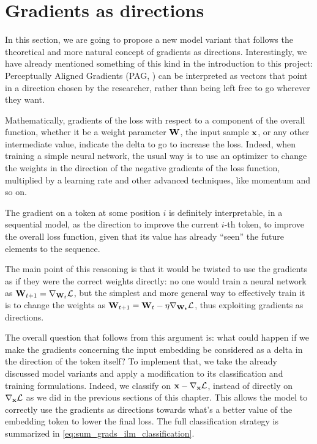 \documentclass[../thesis.tex]{subfiles}
\begin{document}


\section{Gradients as directions}
\label{sec:ilm_inversion_gradients_token_directions}
In this section, we are going to propose a new model variant that follows the theoretical and more natural concept of gradients as directions.
Interestingly, we have already mentioned something of this kind in the introduction to this project: Perceptually Aligned Gradients (PAG, \citet{pag-imply-robustness}) can be interpreted as vectors that point in a direction chosen by the researcher, rather than being left free to go wherever they want.

Mathematically, gradients of the loss with respect to a component of the overall function, whether it be a weight parameter $\mathbf{W}$, the input sample $\mathbf{x}$, or any other intermediate value, indicate the delta to go to increase the loss.
Indeed, when training a simple neural network, the usual way is to use an optimizer to change the weights in the direction of the negative gradients of the loss function, multiplied by a learning rate and other advanced techniques, like momentum and so on.

The gradient on a token at some position $i$ is definitely interpretable, in a sequential model, 
as the direction to improve the current $i$-th token, to improve the overall loss function, given that its value has already ``seen'' the future elements to the sequence.

The main point of this reasoning is that it would be twisted to use the gradients as if they were the correct weights directly: no one would train a neural network as $\mathbf{W}_{t+1} = \nabla_{\mathbf{W}_t} \mathcal{L}$, but the simplest and more general way to effectively train it is to change the weights as $\mathbf{W}_{t+1} = \mathbf{W}_t - \eta \nabla_{\mathbf{W}_t} \mathcal{L}$, thus exploiting gradients as directions.

The overall question that follows from this argument is: what could happen if we make the gradients concerning the input embedding be considered as a delta in the direction of the token itself?
To implement that, we take the already discussed model variants and apply a modification to its classification and training formulations.
Indeed, we classify on $\mathbf{x} - \nabla_{\mathbf{x}} \mathcal{L}$, instead of directly on $\nabla_{\mathbf{x}} \mathcal{L}$ as we did in the previous sections of this chapter.
This allows the model to correctly use the gradients as directions towards what's a better value of the embedding token to lower the final loss. The full classification strategy is summarized in \cref{eq:sum_grads_ilm_classification}.
\end{document}
